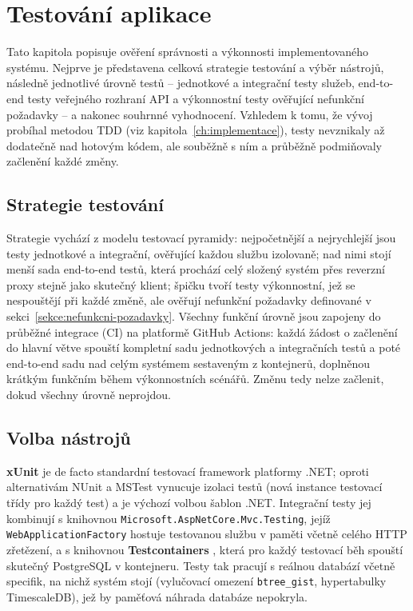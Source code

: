 \chapter{Testování aplikace}
\label{ch:testovani}

Tato kapitola popisuje ověření správnosti a výkonnosti implementovaného systému. Nejprve je představena celková strategie testování a výběr nástrojů, následně jednotlivé úrovně testů -- jednotkové a integrační testy služeb, end-to-end testy veřejného rozhraní API a výkonnostní testy ověřující nefunkční požadavky -- a nakonec souhrnné vyhodnocení. Vzhledem k tomu, že vývoj probíhal metodou TDD (viz kapitola~\ref{ch:implementace}), testy nevznikaly až dodatečně nad hotovým kódem, ale souběžně s ním a průběžně podmiňovaly začlenění každé změny.

\section{Strategie testování}

Strategie vychází z modelu testovací pyramidy: nejpočetnější a nejrychlejší jsou testy jednotkové a integrační, ověřující každou službu izolovaně; nad nimi stojí menší sada end-to-end testů, která prochází celý složený systém přes reverzní proxy stejně jako skutečný klient; špičku tvoří testy výkonnostní, jež se nespouštějí při každé změně, ale ověřují nefunkční požadavky definované v sekci~\ref{sekce:nefunkcni-pozadavky}. Všechny funkční úrovně jsou zapojeny do průběžné integrace (CI) na platformě GitHub Actions: každá žádost o začlenění do hlavní větve spouští kompletní sadu jednotkových a integračních testů a poté end-to-end sadu nad celým systémem sestaveným z kontejnerů, doplněnou krátkým funkčním během výkonnostních scénářů. Změnu tedy nelze začlenit, dokud všechny úrovně neprojdou.

\section{Volba nástrojů}

\textbf{xUnit} \parencite{HomeXUnitnet} je de facto standardní testovací framework platformy .NET; oproti alternativám NUnit a MSTest vynucuje izolaci testů (nová instance testovací třídy pro každý test) a je výchozí volbou šablon .NET. Integrační testy jej kombinují s knihovnou \texttt{Microsoft.AspNetCore.Mvc.Testing}, jejíž \texttt{WebApplicationFactory} hostuje testovanou službu v paměti včetně celého HTTP zřetězení, a s knihovnou \textbf{Testcontainers} \parencite{TestcontainersNET}, která pro každý testovací běh spouští skutečný PostgreSQL v kontejneru. Testy tak pracují s reálnou databází včetně specifik, na nichž systém stojí (vylučovací omezení \texttt{btree\_gist}, hypertabulky TimescaleDB), jež by paměťová náhrada databáze nepokryla.


